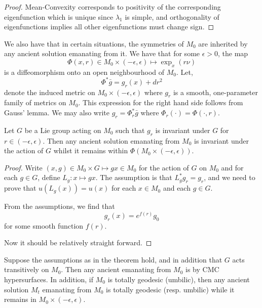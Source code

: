 \documentclass{amsart}
\begin{document}
\begin{proof}
Mean-Convexity corresponds to positivity of the corresponding eigenfunction which is unique since \(\lambda_1\) is simple, and orthogonality of eigenfunctions implies all other eigenfunctions must change sign.
\end{proof}

We also have that in certain situations, the symmetries of \(M_0\) are inherited by any ancient solution emanating from it. We have that for some \(\epsilon > 0\), the map
\[
\Phi (x, r) \in M_0 \times (-\epsilon, \epsilon) \mapsto \exp_x(r\nu)
\]
is a diffeomorphism onto an open neighbourhood of \(M_0\). Let,
\[
\Phi^{\ast} \bar{g} = g_r(x) + dr^2
\]
denote the induced metric on \(M_0 \times (-\epsilon, \epsilon)\) where \(g_r\) is a smooth, one-parameter family of metrics on \(M_0\). This expression for the right hand side follows from Gauss' lemma. We may also write \(g_r = \Phi_r^{\ast} \bar{g}\) where \(\Phi_r (\cdot) = \Phi(\cdot, r)\).

\begin{thm}
Let \(G\) be a Lie group acting on \(M_0\) such that \(g_r\) is invariant under \(G\) for \(r \in (-\epsilon, \epsilon)\). Then any ancient solution emanating from \(M_0\) is invariant under the action of \(G\) whilst it remains within \(\Phi(M_0 \times (-\epsilon, \epsilon))\).
\end{thm}

\begin{proof}
Write \((x, g) \in M_0 \times G \mapsto gx \in M_0\) for the action of \(G\) on \(M_0\) and for each \(g \in G\), define \(L_g : x \mapsto gx\). The assumption is that \(L_g^{\ast} g_r = g_r\), and we need to prove that \(u(L_g(x)) = u(x)\) for each \(x \in M_0\) and each \(g \in G\).

From the assumptions, we find that
\[
g_r(x) = e^{f(r)} g_0
\]
for some smooth function \(f(r)\).

Now it should be relatively straight forward.
\end{proof}

\begin{cor}
Suppose the assumptions as in the theorem hold, and in addition that \(G\) acts transitively on \(M_0\). Then any ancient emanating from \(M_0\) is by CMC hypersurfaces. In addition, if \(M_0\) is totally geodesic (umbilic), then any ancient solution \(M_t\) emanating from \(M_0\) is totally geodesic (resp. umbilic) while it remains in \(M_0 \times (-\epsilon, \epsilon)\).
\end{cor}
\end{document}
